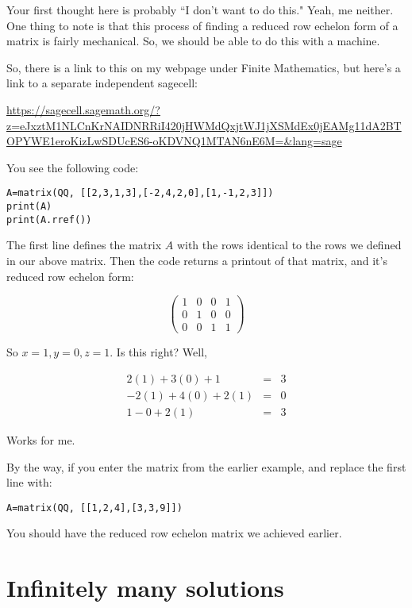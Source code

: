 \documentclass[10pt]{article}
\theoremstyle{definition}
\begin{document}
Your first thought here is probably ``I don't want to do this."  Yeah, me neither.  One thing to note is that this process of finding a reduced row echelon form of a matrix is fairly mechanical.  So, we should be able to do this with a machine.

So, there is a link to this on my webpage under Finite Mathematics, but here's a link to a separate independent sagecell:

\url{https://sagecell.sagemath.org/?z=eJxztM1NLCnKrNAIDNRRiI420jHWMdQxjtWJ1jXSMdEx0jEAMg11dA2BTOPYWE1eroKizLwSDUcES6-oKDVNQ1MTAN6nE6M=&lang=sage}

You see the following code:

\begin{verbatim}
A=matrix(QQ, [[2,3,1,3],[-2,4,2,0],[1,-1,2,3]])
print(A)
print(A.rref())
\end{verbatim}

The first line defines the matrix $A$ with the rows identical to the rows we defined in our above matrix.  Then the code returns a printout of that matrix, and it's reduced row echelon form:


$$ \left( \begin{array}{rrr|r}
1 & 0 & 0& 1\\
0 & 1 & 0 & 0\\
0 & 0 & 1 & 1
\end{array}\right)$$

So $x=1, y=0, z=1$.  Is this right?  Well, 

\begin{eqnarray*}
2(1)+3(0)+1&=&3\\
-2(1)+4(0)+2(1)&=&0\\
1-0+2(1)&=&3
\end{eqnarray*}

Works for me.

By the way, if you enter the matrix from the earlier example, and replace the first line with:

\begin{verbatim}
A=matrix(QQ, [[1,2,4],[3,3,9]])
\end{verbatim}

You should have the reduced row echelon matrix we achieved earlier.






\section{Infinitely many solutions}
\end{document}
